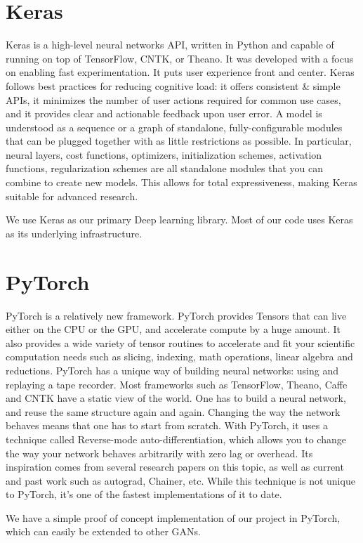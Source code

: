 \section{Keras} %
\label{sec:keras}
Keras is a high-level neural networks API, written in Python and capable of running on top of TensorFlow, CNTK, or Theano. It was developed with a focus on enabling fast experimentation. It puts user experience front and center. Keras follows best practices for reducing cognitive load: it offers consistent \& simple APIs, it minimizes the number of user actions required for common use cases, and it provides clear and actionable feedback upon user error. A model is understood as a sequence or a graph of standalone, fully-configurable modules that can be plugged together with as little restrictions as possible. In particular, neural layers, cost functions, optimizers, initialization schemes, activation functions, regularization schemes are all standalone modules that you can combine to create new models. This allows for total expressiveness, making Keras suitable for advanced research.\par\bigskip
We use Keras as our primary Deep learning library. Most of our code uses Keras as its underlying infrastructure. 

\section{PyTorch} %
\label{sec:pytorch}
PyTorch is a relatively new framework. PyTorch provides Tensors that can live either on the CPU or the GPU, and accelerate compute by a huge amount. It also provides a wide variety of tensor routines to accelerate and fit your scientific computation needs such as slicing, indexing, math operations, linear algebra and reductions. PyTorch has a unique way of building neural networks: using and replaying a tape recorder. Most frameworks such as TensorFlow, Theano, Caffe and CNTK have a static view of the world. One has to build a neural network, and reuse the same structure again and again. Changing the way the network behaves means that one has to start from scratch. With PyTorch, it uses a technique called Reverse-mode auto-differentiation, which allows you to change the way your network behaves arbitrarily with zero lag or overhead. Its inspiration comes from several research papers on this topic, as well as current and past work such as autograd, Chainer, etc. While this technique is not unique to PyTorch, it’s one of the fastest implementations of it to date. \par\bigskip
We have a simple proof of concept implementation of our project in PyTorch, which can easily be extended to other GANs.

